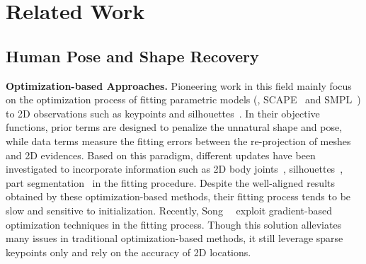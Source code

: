 \documentclass[10pt,twocolumn,letterpaper]{article}
\begin{document}
\section{Related Work}\label{sec:related_work}

\subsection{Human Pose and Shape Recovery}

\textbf{Optimization-based Approaches.}
Pioneering work in this field mainly focus on the optimization process of fitting parametric models (\eg, SCAPE~\cite{anguelov2005scape} and SMPL~\cite{loper2015smpl}) to 2D observations such as keypoints and silhouettes~\cite{sigal2008combined,guan2009estimating,bogo2016keep}.
In their objective functions, prior terms are designed to penalize the unnatural shape and pose, while data terms measure the fitting errors between the re-projection of meshes and 2D evidences.
Based on this paradigm, different updates have been investigated to incorporate information such as 2D body joints~\cite{bogo2016keep}, silhouettes~\cite{lassner2017unite,huang2017towards}, part segmentation~\cite{zanfir2018monocular} in the fitting procedure.
Despite the well-aligned results obtained by these optimization-based methods, their fitting process tends to be slow and sensitive to initialization.
Recently, Song~\etal~\cite{song2020human} exploit gradient-based optimization techniques in the fitting process.
Though this solution alleviates many issues in traditional optimization-based methods, it still leverage sparse keypoints only and rely on the accuracy of 2D locations.
\end{document}

